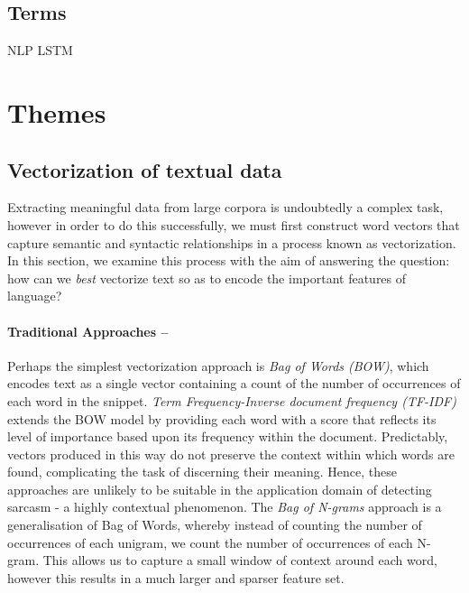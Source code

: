 \documentclass[12pt,a4paper]{article}
\begin{document}
\subsection{Terms}
NLP
LSTM

\newpage

\section{Themes}
\subsection{Vectorization of textual data}
\noindent Extracting meaningful data from large corpora is undoubtedly a complex task, however in order to do this successfully, we must first construct word vectors that capture semantic and syntactic relationships in a process known as vectorization. In this section, we examine this process with the aim of answering the question: how can we \textit{best} vectorize text so as to encode the important features of language?

\paragraph{Traditional Approaches --}
\noindent Perhaps the simplest vectorization approach is \textit{Bag of Words (BOW)}, which encodes text as a single vector containing a count of the number of occurrences of each word in the snippet. \textit{Term Frequency-Inverse document frequency (TF-IDF)} \cite{robertson1976relevance} extends the BOW model by providing each word with a score that reflects its level of importance based upon its frequency within the document. Predictably, vectors produced in this way do not preserve the context within which words are found, complicating the task of discerning their meaning. Hence, these approaches are unlikely to be suitable in the application domain of detecting sarcasm - a highly contextual phenomenon. The \textit{Bag of N-grams} approach is a generalisation of Bag of Words, whereby instead of counting the number of occurrences of each unigram, we count the number of occurrences of each N-gram. This allows us to capture a small window of context around each word, however this results in a much larger and sparser feature set.
\end{document}
